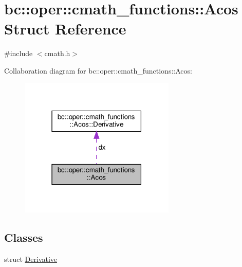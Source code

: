 \hypertarget{structbc_1_1oper_1_1cmath__functions_1_1Acos}{}\section{bc\+:\+:oper\+:\+:cmath\+\_\+functions\+:\+:Acos Struct Reference}
\label{structbc_1_1oper_1_1cmath__functions_1_1Acos}


{\ttfamily \#include $<$cmath.\+h$>$}



Collaboration diagram for bc\+:\+:oper\+:\+:cmath\+\_\+functions\+:\+:Acos\+:\nopagebreak
\begin{figure}[H]
\begin{center}
\leavevmode
\includegraphics[width=210pt]{structbc_1_1oper_1_1cmath__functions_1_1Acos__coll__graph}
\end{center}
\end{figure}
\subsection*{Classes}
\begin{DoxyCompactItemize}
\item 
struct \hyperlink{structbc_1_1oper_1_1cmath__functions_1_1Acos_1_1Derivative}{Derivative}
\end{DoxyCompactItemize}
